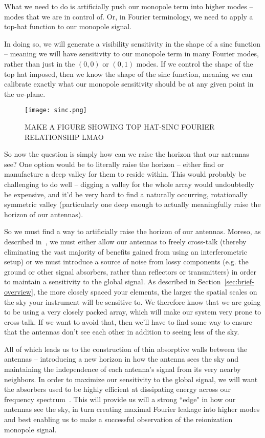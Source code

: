 What we need to do is artificially push our monopole term into higher modes -- 
modes that we are in control of. Or, in Fourier terminology, we need to apply a 
top-hat function to our monopole signal. 

In doing so, we will generate a visibility sensitivity in the shape of a sinc 
function -- meaning we will have sensitivity to our monopole term in many 
Fourier modes, rather than just in the $(0,0)$ or $(0,1)$ modes. If we control 
the shape of the top hat imposed, then we know the shape of the sinc function, 
meaning we can calibrate exactly what our monopole sensitivity should be at any 
given point in the $uv$-plane.

\begin{figure}
    \begin{center}
    \texttt{[image: sinc.png]}
    \end{center}
    \caption{
         MAKE A FIGURE SHOWING TOP HAT-SINC FOURIER RELATIONSHIP LMAO
    }
    \label{fig:sinc}
\end{figure}

So now the question is simply how can we raise the horizon that our antennas 
see? One option would be to literally raise the horizon -- either find or 
manufacture a deep valley for them to reside within. This would probably be 
challenging to do well -- digging a valley for the whole array would 
undoubtedly be expensive, and it'd be very hard to find a naturally occurring, 
rotationally symmetric valley (particularly one deep enough to actually 
meaningfully raise the horizon of our antennas).

So we must find a way to artificially raise the horizon of our antennas.  
Moreso, as described in~\citet{venumadhav2016}, we must either allow our 
antennas to freely cross-talk (thereby eliminating the vast majority of 
benefits gained from using an interferometric setup) or we must introduce a 
source of noise from lossy components (e.g. the ground or other signal 
absorbers, rather than reflectors or transmitters) in order to maintain a 
sensitivity to the global signal. As described in 
Section~\ref{sec:brief-overview}, the more closely spaced your elements, the 
larger the spatial scales on the sky your instrument will be sensitive to. We 
therefore know that we are going to be using a very closely packed array, which 
will make our system very prone to cross-talk. If we want to avoid that, then 
we'll have to find some way to ensure that the antennas don't see each other in 
addition to seeing less of the sky.

All of which leads us to the construction of thin absorptive walls between the 
antennas -- introducing a new horizon in how the antenna sees the sky and 
maintaining the independence of each antenna's signal from its very nearby 
neighbors. In order to maximize our sensitivity to the global signal, we will 
want the absorbers used to be highly efficient at dissipating energy across our 
frequency spectrum~\citep{venumadhav2016}. This will provide us will a strong 
``edge" in how our antennas see the sky, in turn creating maximal Fourier 
leakage into higher modes and best enabling us to make a successful observation 
of the reionization monopole signal.
